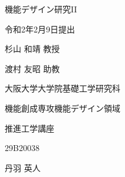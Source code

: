 \begin{center}

    \begin{spacing}{2}
        \vspace{\baselineskip}
    \end{spacing}

    \begin{spacing}{2}
        {\Huge 機能デザイン研究I\hspace{-.1em}I}
    \end{spacing}

    \begin{spacing}{2}
        \vspace{\baselineskip}
    \end{spacing}

    {\Large 令和2年2月9日提出}

    \begin{spacing}{2}
        \vspace{\baselineskip}
    \end{spacing}

    \begin{spacing}{1.4}
        {\Large 杉山 和靖 教授}
    \end{spacing}
    \begin{spacing}{1.4}
        {\Large 渡村 友昭 助教}
    \end{spacing}

    \begin{spacing}{2}
        \vspace{\baselineskip}
    \end{spacing}

    \begin{spacing}{1.2}
        {\Large 大阪大学大学院基礎工学研究科}
    \end{spacing}
    \begin{spacing}{1.2}
        {\Large 機能創成専攻機能デザイン領域}
    \end{spacing}
    \begin{spacing}{1.2}
        {\Large 推進工学講座}
    \end{spacing}
    \begin{spacing}{1.2}
        {\Large 29B20038}
    \end{spacing}
    \begin{spacing}{1.5}
        \vspace{\baselineskip}
    \end{spacing}
    \begin{spacing}{1.2}
        {\Large 丹羽 英人}
    \end{spacing}
\end{center}

